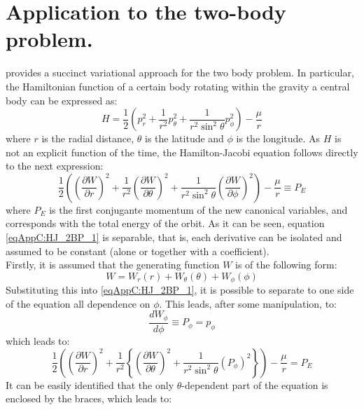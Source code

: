 \section{Application to the two-body problem.}
%
\indent \cite[Wiesel][]{Wiesel} provides a succinct variational approach for the two body problem. In particular, the Hamiltonian function of a certain body rotating within the gravity a central body can be expressed as:
%
\begin{equation}
H = \dfrac{1}{2} \left( p_r^2 + \dfrac{1}{r^2} p_{\theta}^2 + \dfrac{1}{r^2 \sin^2 \theta} p_{\phi}^2 \right) - \dfrac{\mu}{r}
\label{eqAppC:Ham_2BP}
\end{equation}
%
\noindent where $r$ is the radial distance, $\theta$ is the latitude and $\phi$ is the longitude. As $H$ is not an explicit function of the time, the Hamilton-Jacobi equation follows directly to the next expression:
%
\begin{equation}
\dfrac{1}{2} \left( \left(\dfrac{\partial W}{\partial r}\right)^2 + \dfrac{1}{r^2} \left(\dfrac{\partial W}{\partial \theta}\right)^2 + \dfrac{1}{r^2 \sin^2 \theta} \left(\dfrac{\partial W}{\partial \phi}\right)^2 \right) - \dfrac{\mu}{r} \equiv P_E
\label{eqAppC:HJ_2BP_1}
\end{equation}
%
\noindent where $P_E$ is the first conjugante momentum of the new canonical variables, and corresponds with the total energy of the orbit. As it can be seen, equation \eqref{eqAppC:HJ_2BP_1} is separable, that is, each derivative can be isolated and assumed to be constant (alone or together with a coefficient). \\
%
\indent Firstly, it is assumed that the generating function $W$ is of the following form:
%
\[
W = W_r(r) + W_{\theta} (\theta) + W_{\phi} (\phi)
\]
%
\indent Substituting this into \eqref{eqAppC:HJ_2BP_1}, it is possible to separate to one side of the equation all dependence on $\phi$. This leads, after some manipulation, to:
%
\begin{equation}
\dfrac{dW_{\phi}}{d\phi} \equiv P_{\phi} = p_{\phi}
\end{equation}
%
\noindent which leads to:
%
\begin{equation}
\dfrac{1}{2} \left( \left(\dfrac{\partial W}{\partial r}\right)^2 + \dfrac{1}{r^2} \left\{\left(\dfrac{\partial W}{\partial \theta}\right)^2 + \dfrac{1}{r^2 \sin^2 \theta} \left(P_{\phi} \right)^2 \right\} \right)- \dfrac{\mu}{r} = P_E
\end{equation}
%
\indent It can be easily identified that the only $\theta$-dependent part of the equation is enclosed by the braces, which leads to:
